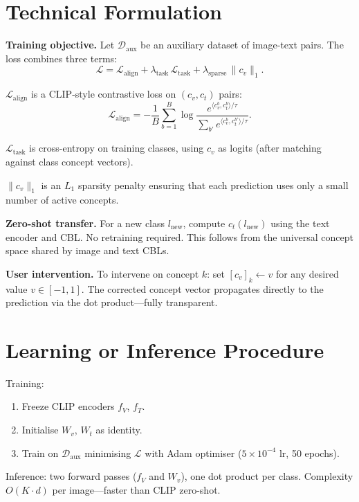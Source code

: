 \documentclass[10pt,twocolumn]{article}
\begin{document}
\section{Technical Formulation}

\textbf{Training objective.}
Let $\mathcal{D}_\mathrm{aux}$ be an auxiliary dataset of image-text
pairs. The loss combines three terms:
\[
\mathcal{L} = \mathcal{L}_\mathrm{align}
            + \lambda_\mathrm{task}\,\mathcal{L}_\mathrm{task}
            + \lambda_\mathrm{sparse}\,\|c_v\|_1.
\]

$\mathcal{L}_\mathrm{align}$ is a CLIP-style contrastive loss on
$(c_v, c_t)$ pairs:
\[
\mathcal{L}_\mathrm{align} =
-\frac{1}{B}\sum_{b=1}^B\log
\frac{e^{\langle c_v^b,c_t^b\rangle/\tau}}
     {\sum_{b'} e^{\langle c_v^b,c_t^{b'}\rangle/\tau}}.
\]

$\mathcal{L}_\mathrm{task}$ is cross-entropy on training classes,
using $c_v$ as logits (after matching against class concept vectors).

$\|c_v\|_1$ is an $L_1$ sparsity penalty ensuring that each prediction
uses only a small number of active concepts.

\textbf{Zero-shot transfer.}
For a new class $l_\mathrm{new}$, compute $c_t(l_\mathrm{new})$
using the text encoder and CBL. No retraining required. This follows
from the universal concept space shared by image and text CBLs.

\textbf{User intervention.}
To intervene on concept $k$: set $[c_v]_k \leftarrow v$ for any
desired value $v \in [-1, 1]$. The corrected concept vector propagates
directly to the prediction via the dot product---fully transparent.

\section{Learning or Inference Procedure}

Training:
\begin{enumerate}[itemsep=2pt,parsep=0pt]
  \item Freeze CLIP encoders $f_V$, $f_T$.
  \item Initialise $W_v$, $W_t$ as identity.
  \item Train on $\mathcal{D}_\mathrm{aux}$ minimising $\mathcal{L}$
    with Adam optimiser ($5\times10^{-4}$ lr, 50 epochs).
\end{enumerate}
Inference: two forward passes ($f_V$ and $W_v$), one dot product per
class. Complexity $O(K \cdot d)$ per image---faster than CLIP zero-shot.
\end{document}
